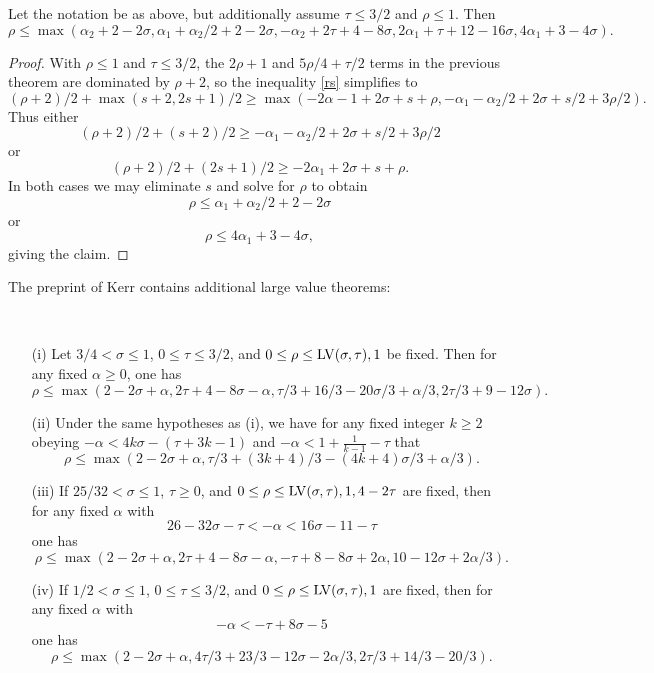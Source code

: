 \begin{corollary}\label{borg-lv-simp} \cite[Lemma 4.60]{bourgain_large_2000} Let the notation be as above, but additionally assume $\tau \leq 3/2$ and $\rho \leq 1$.  Then
$$ \rho \leq \max( \alpha_2 + 2 - 2 \sigma, \alpha_1+\alpha_2/2 + 2-2\sigma, -\alpha_2 + 2\tau+4-8\sigma, 2\alpha_1 + \tau + 12 - 16 \sigma, 4\alpha_1 + 3-4\sigma).$$
\end{corollary}

\begin{proof}  With $\rho \leq 1$ and $\tau \leq 3/2$, the $2\rho+1$ and $5\rho/4+\tau/2$ terms in the previous theorem are dominated by $\rho+2$, so the inequality \eqref{rs} simplifies to
$$(\rho+2)/2 + \max(s+2, 2s+1)/2 \geq
    \max( -2\alpha-1 + 2\sigma + s + \rho, -\alpha_1 - \alpha_2/2 + 2\sigma + s/2 + 3\rho/2).$$
Thus either
$$(\rho+2)/2 + (s+2)/2 \geq -\alpha_1 - \alpha_2/2 + 2\sigma + s/2 + 3\rho/2$$
or
$$(\rho+2)/2 + (2s+1)/2 \geq  -2\alpha_1 + 2\sigma + s + \rho.$$
In both cases we may eliminate $s$ and solve for $\rho$ to obtain
$$ \rho \leq \alpha_1 + \alpha_2/2 + 2 - 2 \sigma $$
or
$$ \rho \leq 4\alpha_1 + 3 - 4 \sigma,$$
giving the claim.
\end{proof}



The preprint of Kerr \cite{kerr} contains additional large value theorems:

\begin{lemma}\label{kerr-thm}\
    \begin{itemize}
    \item[(i)]\cite[Theorem 2]{kerr} Let $3/4 < \sigma \leq 1$, $0 \leq \tau \leq 3/2$, and $0 \leq \rho \leq \mathrm{LV}(\sigma,\tau), 1$ be fixed.  Then for any fixed $\alpha \geq 0$, one has
    $$ \rho \leq \max( 2-2\sigma+\alpha, 2\tau+4-8\sigma-\alpha, \tau/3+16/3 -20\sigma/3 + \alpha/3, 2\tau/3+9-12\sigma).$$
    \item[(ii)] \cite[Theorem 3]{kerr} Under the same hypotheses as (i), we have for any fixed integer $k \geq 2$ obeying
    $-\alpha < 4k\sigma -(\tau+3k-1)$ and $-\alpha < 1 + \frac{1}{k-1} - \tau$ that
    $$ \rho \leq \max(2-2\sigma+\alpha, \tau/3+(3k+4)/3-(4k+4)\sigma/3 + \alpha/3).$$
    \item[(iii)] \cite[Theorem 4]{kerr} If $25/32 < \sigma \leq 1$, $\tau \geq 0$, and $0 \leq \rho \leq \mathrm{LV}(\sigma,\tau), 1, 4-2\tau$ are fixed, then for any fixed $\alpha$ with
    $$ 26 - 32 \sigma - \tau < - \alpha < 16\sigma -11-\tau$$
    one has
    $$ \rho \leq \max( 2-2\sigma+\alpha, 2\tau+4-8\sigma-\alpha, -\tau+8-8\sigma+2\alpha, 10-12\sigma+2\alpha/3).$$
    \item[(iv)] \cite[Theorem 5]{kerr} If $1/2 < \sigma \leq 1$, $0 \leq \tau \leq 3/2$, and $0 \leq \rho \leq \mathrm{LV}(\sigma,\tau), 1$ are fixed, then for any fixed $\alpha$ with
    $$ - \alpha < -\tau + 8\sigma - 5$$
    one has
    $$ \rho \leq \max(2-2\sigma+\alpha, 4\tau/3 +23/3 - 12\sigma - 2\alpha/3, 2\tau/3 + 14/3 - 20/3 ).$$
\end{itemize}
\end{lemma}
